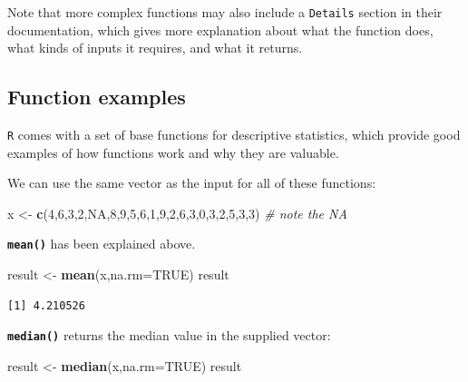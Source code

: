 \documentclass[
]{book}
\newenvironment{Shaded}{\begin{snugshade}}{\end{snugshade}}
\newcommand{\CommentTok}[1]{\textcolor[rgb]{0.56,0.35,0.01}{\textit{#1}}}
\newcommand{\DataTypeTok}[1]{\textcolor[rgb]{0.13,0.29,0.53}{#1}}
\newcommand{\DecValTok}[1]{\textcolor[rgb]{0.00,0.00,0.81}{#1}}
\newcommand{\KeywordTok}[1]{\textcolor[rgb]{0.13,0.29,0.53}{\textbf{#1}}}
\newcommand{\NormalTok}[1]{#1}
\newcommand{\OtherTok}[1]{\textcolor[rgb]{0.56,0.35,0.01}{#1}}
\newcommand{\StringTok}[1]{\textcolor[rgb]{0.31,0.60,0.02}{#1}}
\begin{document}
Note that more complex functions may also include a \texttt{Details} section in their documentation, which gives more explanation about what the function does, what kinds of inputs it requires, and what it returns.

\hypertarget{function-examples}{%
\subsection*{Function examples}\label{function-examples}}

\texttt{R} comes with a set of base functions for descriptive statistics, which provide good examples of how functions work and why they are valuable.

We can use the same vector as the input for all of these functions:

\begin{Shaded}
\begin{Highlighting}[]
\NormalTok{x <-}\StringTok{ }\KeywordTok{c}\NormalTok{(}\DecValTok{4}\NormalTok{,}\DecValTok{6}\NormalTok{,}\DecValTok{3}\NormalTok{,}\DecValTok{2}\NormalTok{,}\OtherTok{NA}\NormalTok{,}\DecValTok{8}\NormalTok{,}\DecValTok{9}\NormalTok{,}\DecValTok{5}\NormalTok{,}\DecValTok{6}\NormalTok{,}\DecValTok{1}\NormalTok{,}\DecValTok{9}\NormalTok{,}\DecValTok{2}\NormalTok{,}\DecValTok{6}\NormalTok{,}\DecValTok{3}\NormalTok{,}\DecValTok{0}\NormalTok{,}\DecValTok{3}\NormalTok{,}\DecValTok{2}\NormalTok{,}\DecValTok{5}\NormalTok{,}\DecValTok{3}\NormalTok{,}\DecValTok{3}\NormalTok{)  }\CommentTok{# note the NA}
\end{Highlighting}
\end{Shaded}

\textbf{\texttt{mean()}} has been explained above.

\begin{Shaded}
\begin{Highlighting}[]
\NormalTok{result <-}\StringTok{ }\KeywordTok{mean}\NormalTok{(x,}\DataTypeTok{na.rm=}\OtherTok{TRUE}\NormalTok{)}
\NormalTok{result}
\end{Highlighting}
\end{Shaded}

\begin{verbatim}
[1] 4.210526
\end{verbatim}

\textbf{\texttt{median()}} returns the median value in the supplied vector:

\begin{Shaded}
\begin{Highlighting}[]
\NormalTok{result <-}\StringTok{ }\KeywordTok{median}\NormalTok{(x,}\DataTypeTok{na.rm=}\OtherTok{TRUE}\NormalTok{)}
\NormalTok{result}
\end{Highlighting}
\end{Shaded}
\end{document}
